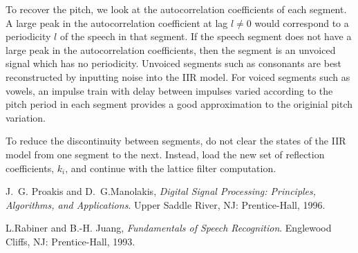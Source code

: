 To recover the pitch, we look at the autocorrelation coefficients of 
each segment.  A large peak in the autocorrelation coefficient at 
lag $l\neq0$ would correspond to a periodicity $l$ of the speech 
in that segment.  If the speech segment does not have a large peak 
in the autocorrelation coefficients, then the segment is an 
unvoiced signal which has no periodicity.  Unvoiced segments such as 
consonants are best reconstructed by inputting noise into the IIR 
model.  For voiced segments such as vowels, an impulse train 
with delay between impulses varied according to the pitch period 
in each segment provides a good approximation to the originial pitch 
variation.

To reduce the discontinuity between segments, do not clear the 
states of the IIR model from one segment to the next.  Instead, load 
the new set of reflection coefficients, $k_i$, and continue with the 
lattice filter computation.

\begin{thebibliography}{2}

J.~G. Proakis and D.~G.Manolakis, {\em Digital Signal Processing: 
Principles, Algorithms, and Applications}.
\newblock Upper Saddle River, NJ: Prentice-Hall, 1996.

L.Rabiner and B.-H. Juang, {\em Fundamentals of Speech Recognition}.
\newblock Englewood Cliffs, NJ: Prentice-Hall, 1993.

\end{thebibliography}

